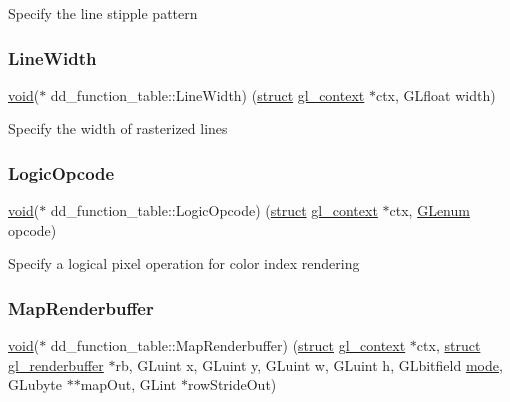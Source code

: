 Specify the line stipple pattern \mbox{\label{structdd__function__table_aeed6f87badf8228355b8c08bb0199dca}} 
\subsubsection{\texorpdfstring{Line\+Width}{LineWidth}}
{\footnotesize\ttfamily \hyperlink{interfacevoid}{void}($\ast$ dd\+\_\+function\+\_\+table\+::\+Line\+Width) (\hyperlink{interfacestruct}{struct} \hyperlink{structgl__context}{gl\+\_\+context} $\ast$ctx, G\+Lfloat width)}

Specify the width of rasterized lines \mbox{\label{structdd__function__table_a0a18048817ee65f99d555958cd79c83d}} 
\subsubsection{\texorpdfstring{Logic\+Opcode}{LogicOpcode}}
{\footnotesize\ttfamily \hyperlink{interfacevoid}{void}($\ast$ dd\+\_\+function\+\_\+table\+::\+Logic\+Opcode) (\hyperlink{interfacestruct}{struct} \hyperlink{structgl__context}{gl\+\_\+context} $\ast$ctx, \hyperlink{interfacevoid}{G\+Lenum} opcode)}

Specify a logical pixel operation for color index rendering \mbox{\label{structdd__function__table_af1eb4b8689ff956a3ee1ebbd5c23aa2e}} 
\subsubsection{\texorpdfstring{Map\+Renderbuffer}{MapRenderbuffer}}
{\footnotesize\ttfamily \hyperlink{interfacevoid}{void}($\ast$ dd\+\_\+function\+\_\+table\+::\+Map\+Renderbuffer) (\hyperlink{interfacestruct}{struct} \hyperlink{structgl__context}{gl\+\_\+context} $\ast$ctx, \hyperlink{interfacestruct}{struct} \hyperlink{structgl__renderbuffer}{gl\+\_\+renderbuffer} $\ast$rb, G\+Luint x, G\+Luint y, G\+Luint w, G\+Luint h, G\+Lbitfield \hyperlink{interfacevoid}{mode}, G\+Lubyte $\ast$$\ast$map\+Out, G\+Lint $\ast$row\+Stride\+Out)}

